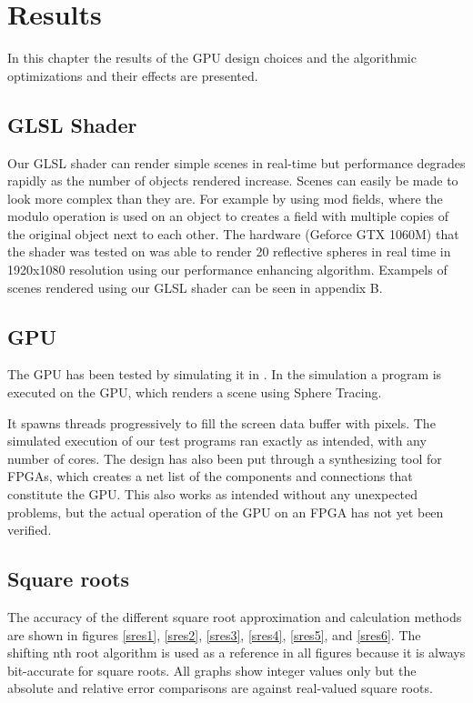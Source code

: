 \chapter{Results}

	In this chapter the results of the GPU design choices and the algorithmic
	optimizations and their effects are presented.

	\section{GLSL Shader}

		Our GLSL shader can render simple scenes in real-time but performance
		degrades rapidly as the number of objects rendered increase. Scenes can
		easily be made to look more complex than they are. For example by using mod
		fields, where the modulo operation is used on an object to creates a field
		with multiple copies of the original object next to each other. The
		hardware (Geforce GTX 1060M) that the shader was tested on was able to
		render 20 reflective spheres in real time in 1920x1080 resolution using our
		performance enhancing algorithm. Exampels of scenes rendered using our GLSL
		shader can be seen in appendix B.
 
	\section{GPU}
	
		The GPU has been tested by simulating it in \clash. In the simulation a
		program is executed on the GPU, which renders a scene using Sphere
		Tracing. 

		It spawns threads progressively to fill the screen data buffer with pixels.
		The simulated execution of our test programs ran exactly as intended, with
		any number of cores. The design has also been put through a synthesizing
		tool for FPGAs, which creates a net list of the components and connections
		that constitute the GPU. This also works as intended without any unexpected
		problems, but the actual operation of the GPU on an FPGA has not yet been
		verified.
	
	\section{Square roots}
		
		The accuracy of the different square root approximation and calculation
		methods are shown in figures \ref{sres1}, \ref{sres2}, \ref{sres3},
		\ref{sres4}, \ref{sres5}, and \ref{sres6}. The shifting nth root
		algorithm is used as a reference in all figures because it is always
		bit-accurate for square roots. All graphs show integer values only but the
		absolute and relative error comparisons are against real-valued square
		roots.

